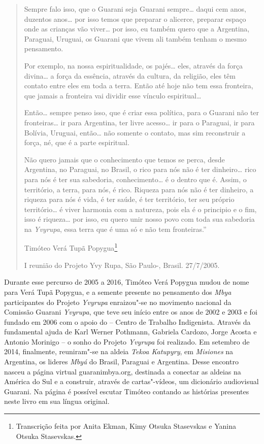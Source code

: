 \begin{quote}
Sempre falo isso, que o Guarani seja Guarani sempre… daqui cem
anos, duzentos anos… por isso temos que preparar o alicerce,
preparar espaço onde as crianças vão viver… por isso, eu também
quero que a Argentina, Paraguai, Uruguai, os Guarani que vivem ali
também tenham o mesmo pensamento.

Por exemplo, na nossa espiritualidade, os pajés… eles, através da
força divina… a força da essência, através da cultura, da
religião, eles têm contato entre eles em toda a terra. Então até hoje
não tem essa fronteira, que jamais a fronteira vai dividir esse vínculo
espiritual…

Então… sempre penso isso, que é criar essa política, para o
Guarani não ter fronteiras… ir para Argentina, ter livre
acesso… ir para o Paraguai, ir para Bolívia, Uruguai,
então… não somente o contato, mas sim reconstruir a força, né,
que é a parte espiritual.

Não quero jamais que o conhecimento que temos se perca, desde Argentina,
no Paraguai, no Brasil, o rico para nós não é ter dinheiro… rico
para nós é ter sua sabedoria, conhecimento… é o dentro que é.
Assim, o território, a terra, para nós, é rico. Riqueza para nós não é
ter dinheiro, a riqueza para nós é vida, é ter saúde, é ter território,
ter seu próprio território… é viver harmonia com a natureza, pois
ela é o principio e o fim, isso é riqueza… por isso, eu quero
unir nosso povo com toda sua sabedoria na \emph{Yvyrupa}, essa terra que
é uma só e não tem fronteiras.''

\medskip 
\hfill Timóteo Verá Tupã Popygua\footnote{ Transcrição feita por Anita Ekman, Kimy Otsuka Stasevskas e Yanina
Otsuka Stasevskas.}\smallskip 

\hfill \begin{minipage}{.6\textwidth}\footnotesize
I reunião do {Projeto Yvy Rupa}, São Paulo-,
Brasil. 27/7/2005. 
\end{minipage}

\end{quote}

 

Durante esse percurso de 2005 a 2016, Timóteo Verá Popygua mudou de nome
para Verá Tupã Popygua, e a semente presente no pensamento
dos \emph{Mbya} participantes
do {Projeto }\emph{{Yvyrupa}} enraizou"-se no movimento
nacional da {Comissão Guarani }\emph{{Yvyrupa}}, que teve seu início entre os anos de 2002 e 2003 e foi fundado em 2006 com o apoio do { -- Centro de Trabalho Indigenista}.
Através da fundamental ajuda de Karl Werner Pothmann, Gabriela Cardozo,
Jorge Acosta e Antonio Morinigo -- o sonho
do {Projeto }\emph{{Yvyrupa}} foi realizado. Em setembro
de 2014, finalmente, reuniram"-se na aldeia \emph{Tekoa Katupyry},
em \emph{Misiones }na Argentina, os lideres \emph{Mbyá} do Brasil,
Paraguai e Argentina. Desse encontro nasceu a página
virtual guaranimbya.org, destinada a conectar as aldeias
na América do Sul e a construir, através de cartas"-vídeos, um dicionário
audiovisual Guarani. Na página é possível escutar Timóteo contando as
histórias presentes neste livro em sua língua original. 

